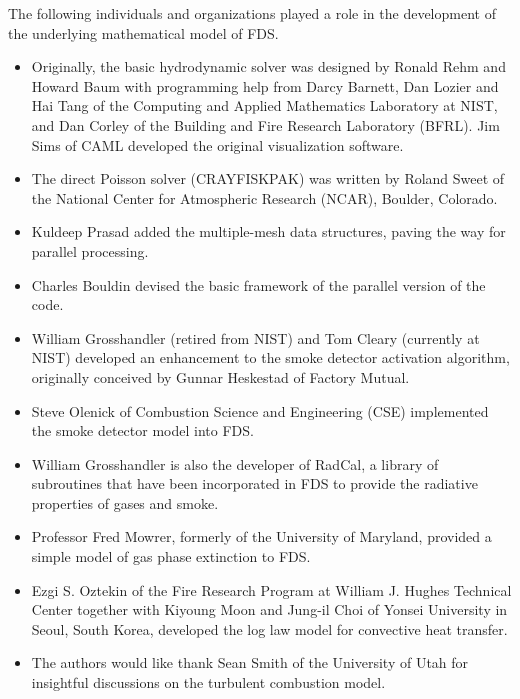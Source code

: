 \documentclass[11pt]{book}
\begin{document}
The following individuals and organizations played a role in the development of the underlying mathematical model of FDS.
\begin{itemize}
\item Originally, the basic hydrodynamic solver was designed by Ronald Rehm and Howard Baum with programming help from Darcy Barnett, Dan Lozier and Hai Tang of the Computing and Applied Mathematics Laboratory at NIST, and Dan Corley of the Building and Fire Research Laboratory (BFRL). Jim Sims of CAML developed the original visualization software.
\item The direct Poisson solver (CRAYFISKPAK) was written by Roland Sweet of the National Center for Atmospheric Research (NCAR), Boulder, Colorado.
\item Kuldeep Prasad added the multiple-mesh data structures, paving the way for parallel processing.
\item Charles Bouldin devised the basic framework of the parallel version of the code.
\item William Grosshandler (retired from NIST) and Tom Cleary (currently at NIST) developed an enhancement to the smoke detector activation algorithm, originally conceived by Gunnar Heskestad of Factory Mutual.
\item Steve Olenick of Combustion Science and Engineering (CSE) implemented the smoke detector model into FDS.
\item William Grosshandler is also the developer of RadCal, a library of subroutines that have been incorporated in FDS to provide the radiative properties of gases and smoke.
\item Professor Fred Mowrer, formerly of the University of Maryland, provided a simple model of gas phase extinction to FDS.
\item Ezgi S. Oztekin of the Fire Research Program at William J. Hughes Technical Center together with Kiyoung Moon and Jung-il Choi of Yonsei University in Seoul, South Korea, developed the log law model for convective heat transfer.
\item The authors would like thank Sean Smith of the University of Utah for insightful discussions on the turbulent combustion model.
\end{itemize}

\cleardoublepage
{}
{}
\tableofcontents

\cleardoublepage
{}
{}
\listoffigures
\end{document}
